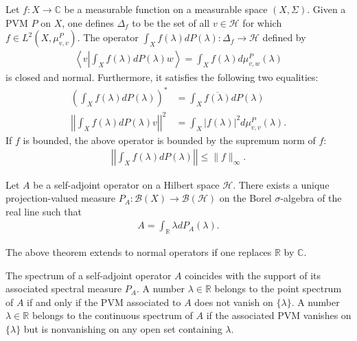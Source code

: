     \begin{property}
        Let $f:X\rightarrow\mathbb{C}$ be a measurable function on a measurable space $(X,\Sigma)$. Given a PVM $P$ on $X$, one defines $\Delta_f$ to be the set of all $v\in\mathcal{H}$ for which $f\in L^2(X, \mu^P_{v,v})$. The operator $\int_Xf(\lambda)dP(\lambda):\Delta_f\rightarrow\mathcal{H}$ defined by
        \begin{gather}
            \left\langle v\left|\int_Xf(\lambda)dP(\lambda)w\right.\right\rangle = \int_Xf(\lambda)d\mu^P_{v,w}(\lambda)
        \end{gather}
        is closed and normal. Furthermore, it satisfies the following two equalities:
        \begin{align}
            \left(\int_Xf(\lambda)dP(\lambda)\right)^* &= \int_X\overline{f(\lambda)}dP(\lambda)\\
            \left|\left|\int_Xf(\lambda)dP(\lambda)v\right|\right|^2 &= \int_X|f(\lambda)|^2d\mu^P_{v,v}(\lambda).
        \end{align}
        If $f$ is bounded, the above operator is bounded by the supremum norm of $f$:
        \begin{gather}
            \left|\left|\int_Xf(\lambda)dP(\lambda)\right|\right|\leq\|f\|_\infty.
        \end{gather}
    \end{property}

    \begin{theorem}
        Let $A$ be a self-adjoint operator on a Hilbert space $\mathcal{H}$. There exists a unique projection-valued measure $P_A:\mathcal{B}(X)\rightarrow\mathcal{B}(\mathcal{H})$ on the Borel $\sigma$-algebra of the real line such that
        \begin{gather}
            A = \int_{\mathbb{R}}\lambda dP_A(\lambda).
        \end{gather}
    \end{theorem}
    \begin{remark}
        The above theorem extends to normal operators if one replaces $\mathbb{R}$ by $\mathbb{C}$.
    \end{remark}
    \begin{property}
        The spectrum of a self-adjoint operator $A$ coincides with the support of its associated spectral measure $P_A$. A number $\lambda\in\mathbb{R}$ belongs to the point spectrum of $A$ if and only if the PVM associated to $A$ does not vanish on $\{\lambda\}$. A number $\lambda\in\mathbb{R}$ belongs to the continuous spectrum of $A$ if the associated PVM vanishes on $\{\lambda\}$ but is nonvanishing on any open set containing $\lambda$.
    \end{property}

